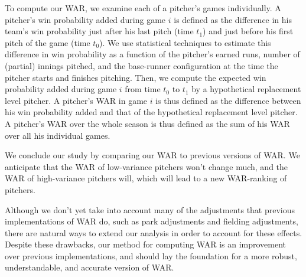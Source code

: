 \documentclass[12pt]{article}
\begin{document}
To compute our WAR, we examine each of a pitcher's games individually. A pitcher's win probability added during game $i$ is defined as the difference in his team's win probability just after his last pitch (time $t_1$) and just before his first pitch of the game (time $t_0$). We use statistical techniques to estimate this difference in win probability as a function of the pitcher's earned runs, number of (partial) innings pitched, and the base-runner configuration at the time the pitcher starts and finishes pitching. Then, we compute the expected win probability added during game $i$ from time $t_0$ to $t_1$ by a hypothetical replacement level pitcher. A pitcher's WAR in game $i$ is thus defined as the difference between his win probability added and that of the hypothetical replacement level pitcher. A pitcher's WAR over the whole season is thus defined as the sum of his WAR over all his individual games.

We conclude our study by comparing our WAR to previous versions of WAR. We anticipate that the WAR of low-variance pitchers won't change much, and the WAR of high-variance pitchers will, which will lead to a new WAR-ranking of pitchers. 

Although we don't yet take into account many of the adjustments that previous implementations of WAR do, such as park adjustments and fielding adjustments, there are natural ways to extend our analysis in order to account for these effects. Despite these drawbacks, our method for computing WAR is an improvement over previous implementations, and should lay the foundation for a more robust, understandable, and accurate version of WAR.








\end{document}
